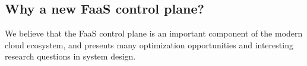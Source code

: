 \subsection{Why a new FaaS control plane?}
\label{sec:bg:ynew}


We believe that the FaaS control plane is an important component of the modern cloud ecosystem, and presents many optimization opportunities and interesting research questions in system design. 

